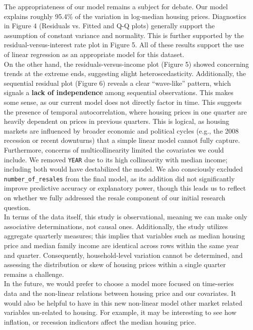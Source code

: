 \documentclass[10pt]{article}
\begin{document}
The appropriateness of our model remains a subject for debate. Our model explains roughly 95.4\% of the variation in log-median housing prices. Diagnostics in Figure 4 (Residuals vs. Fitted and Q-Q plots) generally support the assumption of constant variance and normality. This is further supported by the residual-versus-interest rate plot in Figure 5.  All of these results support the use of linear regression as an appropriate model for this dataset. \\

On the other hand, the residuals-versus-income plot (Figure 5) showed concerning trends at the extreme ends, suggesting slight heteroscedasticity. Additionally, the sequential residual plot (Figure 6) reveals a clear ``wave-like'' pattern, which signals a \textbf{lack of independence} among sequential observations. This makes some sense, as our current model does not directly factor in time. This suggests the presence of temporal autocorrelation, where housing prices in one quarter are heavily dependent on prices in previous quarters. This is logical, as housing markets are influenced by broader economic and political cycles (e.g., the 2008 recession or recent downturns) that a simple linear model cannot fully capture.\\

Furthermore, concerns of multicollinearity limited the covariates we could include. We removed \texttt{YEAR} due to its high collinearity with median income; including both would have destabilized the model. We also consciously excluded \texttt{number\_of\_resales} from the final model, as its addition did not significantly improve predictive accuracy or explanatory power, though this leads us to reflect on whether we fully addressed the resale component of our initial research question. \\

In terms of the data itself, this study is observational, meaning we can make only associative determinations, not causal ones. Additionally, the study utilizes aggregate quarterly measures; this implies that variables such as median housing price and median family income are identical across rows within the same year and quarter. Consequently, household-level variation cannot be determined, and assessing the distribution or skew of housing prices within a single quarter remains a challenge. \\

In the future, we would prefer to choose a model more focused on time-series data and the non-linear relations between housing price and our covariates. It would also be helpful to have in this new non-linear model other market related variables un-related to housing. For example, it may be interesting to see how inflation, or recession indicators affect the median housing price. \\
\end{document}

